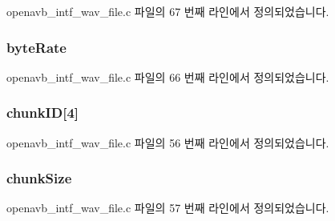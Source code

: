 openavb\+\_\+intf\+\_\+wav\+\_\+file.\+c 파일의 67 번째 라인에서 정의되었습니다.

\subsubsection[{\texorpdfstring{byte\+Rate}{byteRate}}]{ byte\+Rate}\hypertarget{structwav__file__header__t_a2ca7364c771bb6b2438e9d203af4db56}{}\label{structwav__file__header__t_a2ca7364c771bb6b2438e9d203af4db56}


openavb\+\_\+intf\+\_\+wav\+\_\+file.\+c 파일의 66 번째 라인에서 정의되었습니다.

\subsubsection[{\texorpdfstring{chunk\+ID}{chunkID}}]{ chunk\+ID\mbox{[}4\mbox{]}}\hypertarget{structwav__file__header__t_a872c501aaf527b2d1be2bea3b8167bec}{}\label{structwav__file__header__t_a872c501aaf527b2d1be2bea3b8167bec}


openavb\+\_\+intf\+\_\+wav\+\_\+file.\+c 파일의 56 번째 라인에서 정의되었습니다.

\subsubsection[{\texorpdfstring{chunk\+Size}{chunkSize}}]{ chunk\+Size}\hypertarget{structwav__file__header__t_ad8822f8920bd1a82c31ca22bcd125ea1}{}\label{structwav__file__header__t_ad8822f8920bd1a82c31ca22bcd125ea1}


openavb\+\_\+intf\+\_\+wav\+\_\+file.\+c 파일의 57 번째 라인에서 정의되었습니다.

